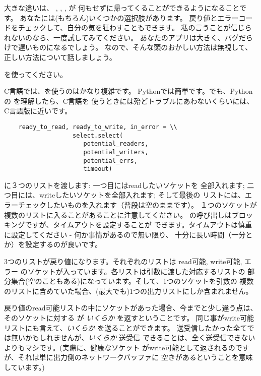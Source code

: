 \documentclass{howto}
\begin{document}
大きな違いは、 , , ,  が
何もせずに帰ってくることができるようになることです。
あなたには(もちろん)いくつかの選択肢があります。
戻り値とエラーコードをチェックして、自分の気を狂わすこともできます。
私の言うことが信じられないのなら、一度試してみてください。
あなたのアプリは大きく、バグだらけで遅いものになるでしょう。
なので、そんな頭のおかしい方法は無視して、正しい方法について話しましょう。

 を使ってください。

C言語では、を使うのはかなり複雑です。
Pythonでは簡単です。でも、Pythonの  を理解したら、C言語を
使うときには殆どトラブルにあわないくらいには、C言語版に近いです。

\begin{verbatim}    ready_to_read, ready_to_write, in_error = \\
                   select.select(
                      potential_readers, 
                      potential_writers, 
                      potential_errs, 
                      timeout)
\end{verbatim}

 に３つのリストを渡します: 一つ目にはreadしたいソケットを
全部入れます; 二つ目には、writeしたいソケットを全部入れます; そして最後の
リストには、エラーチェックしたいものを入れます（普段は空のままです）。
１つのソケットが複数のリストに入ることがあることに注意してください。
 の呼び出しはブロッキングですが、タイムアウトを設定することが
できます。タイムアウトは慎重に設定してください - 何か事情があるので無い限り、
十分に長い時間（一分とか）を設定するのが良いです。


3つのリストが戻り値になります。それぞれのリストは read可能, write可能, 
エラー のソケットが入っています。各リストは引数に渡した対応するリストの
部分集合(空のこともある)になっています。そして、1つのソケットを引数の
複数のリストに含めていた場合、(最大でも)1つの出力リストにしか含まれません。


戻り値のread可能リストの中にソケットがあった場合、今までと少し違う点は、
そのソケットに対する  が \emph{いくらか} を返すということです。
同じ事がwrite可能リストにも言えて、\emph{いくらか} を送ることができます。
送受信したかった全てでは無いかもしれませんが、\emph{いくらか} 送受信
できることは、全く送受信できないよりもマシです。(実際に、健康なソケット
がwrite可能として返されるのですが、それは単に出力側のネットワークバッファに
空きがあるということを意味しています。)
\end{document}
